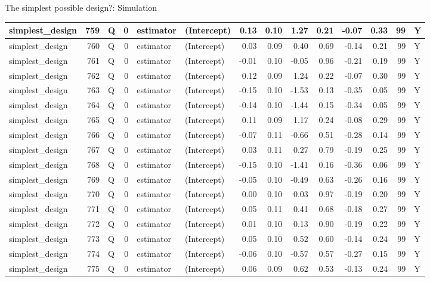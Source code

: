 \documentclass[
  11pt,
  ignorenonframetext,
]{beamer}
\begin{document}
\begin{frame}[fragile]{The simplest possible design?: Simulation}
\begin{tabular}{l|r|l|r|l|l|r|r|r|r|r|r|r|l}
\hline
simplest\_design & 759 & Q & 0 & estimator & (Intercept) & 0.13 & 0.10 & 1.27 & 0.21 & -0.07 & 0.33 & 99 & Y\\
\hline
simplest\_design & 760 & Q & 0 & estimator & (Intercept) & 0.03 & 0.09 & 0.40 & 0.69 & -0.14 & 0.21 & 99 & Y\\
\hline
simplest\_design & 761 & Q & 0 & estimator & (Intercept) & -0.01 & 0.10 & -0.05 & 0.96 & -0.21 & 0.19 & 99 & Y\\
\hline
simplest\_design & 762 & Q & 0 & estimator & (Intercept) & 0.12 & 0.09 & 1.24 & 0.22 & -0.07 & 0.30 & 99 & Y\\
\hline
simplest\_design & 763 & Q & 0 & estimator & (Intercept) & -0.15 & 0.10 & -1.53 & 0.13 & -0.35 & 0.05 & 99 & Y\\
\hline
simplest\_design & 764 & Q & 0 & estimator & (Intercept) & -0.14 & 0.10 & -1.44 & 0.15 & -0.34 & 0.05 & 99 & Y\\
\hline
simplest\_design & 765 & Q & 0 & estimator & (Intercept) & 0.11 & 0.09 & 1.17 & 0.24 & -0.08 & 0.29 & 99 & Y\\
\hline
simplest\_design & 766 & Q & 0 & estimator & (Intercept) & -0.07 & 0.11 & -0.66 & 0.51 & -0.28 & 0.14 & 99 & Y\\
\hline
simplest\_design & 767 & Q & 0 & estimator & (Intercept) & 0.03 & 0.11 & 0.27 & 0.79 & -0.19 & 0.25 & 99 & Y\\
\hline
simplest\_design & 768 & Q & 0 & estimator & (Intercept) & -0.15 & 0.10 & -1.41 & 0.16 & -0.36 & 0.06 & 99 & Y\\
\hline
simplest\_design & 769 & Q & 0 & estimator & (Intercept) & -0.05 & 0.10 & -0.49 & 0.63 & -0.26 & 0.16 & 99 & Y\\
\hline
simplest\_design & 770 & Q & 0 & estimator & (Intercept) & 0.00 & 0.10 & 0.03 & 0.97 & -0.19 & 0.20 & 99 & Y\\
\hline
simplest\_design & 771 & Q & 0 & estimator & (Intercept) & 0.05 & 0.11 & 0.41 & 0.68 & -0.18 & 0.27 & 99 & Y\\
\hline
simplest\_design & 772 & Q & 0 & estimator & (Intercept) & 0.01 & 0.10 & 0.13 & 0.90 & -0.19 & 0.22 & 99 & Y\\
\hline
simplest\_design & 773 & Q & 0 & estimator & (Intercept) & 0.05 & 0.10 & 0.52 & 0.60 & -0.14 & 0.24 & 99 & Y\\
\hline
simplest\_design & 774 & Q & 0 & estimator & (Intercept) & -0.06 & 0.10 & -0.57 & 0.57 & -0.27 & 0.15 & 99 & Y\\
\hline
simplest\_design & 775 & Q & 0 & estimator & (Intercept) & 0.06 & 0.09 & 0.62 & 0.53 & -0.13 & 0.24 & 99 & Y\\

\end{tabular}
\end{frame}
\end{document}

